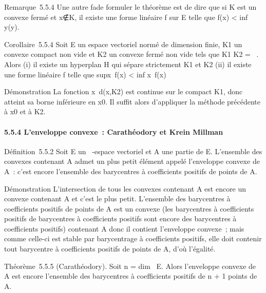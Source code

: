 Remarque~5.5.4 Une autre fa\ccon de formuler le
théorème est de dire que si K est un convexe fermé et
x∉K, il existe une forme linéaire f sur E
telle que f(x) \textless{} inf~
y\inKf(y).

Corollaire~5.5.4 Soit E un espace vectoriel normé de dimension finie,
K1 un convexe compact non vide et K2 un convexe
fermé non vide tels que K1 \bigcap K2 = \varnothing~. Alors (i) il
existe un hyperplan H qui sépare strictement K1 et
K2 (ii) il existe une forme linéaire f telle que
supx~f(x)
\textless{} inf x~f(x)

Démonstration La fonction x\mapsto~d(x,K2)
est continue sur le compact K1, donc atteint sa borne
inférieure en x0. Il suffit alors d'appliquer la méthode
précédente à x0 et à K2.

\paragraph{5.5.4 L'enveloppe convexe~: Carathéodory et Krein Millman}

Définition~5.5.2 Soit E un ~-espace vectoriel et A une partie de E.
L'ensemble des convexes contenant A admet un plus petit élément appelé
l'enveloppe convexe de A~: c'est encore l'ensemble des barycentres à
coefficients positifs de points de A.

Démonstration L'intersection de tous les convexes contenant A est encore
un convexe contenant A et c'est le plus petit. L'ensemble des
barycentres à coefficients positifs de points de A est un convexe (les
barycentres à coefficients positifs de barycentres à coefficients
positifs sont encore des barycentres à coefficients positifs) contenant
A donc il contient l'enveloppe convexe~; mais comme celle-ci est stable
par barycentrage à coefficients positifs, elle doit contenir tout
barycentre à coefficients positifs de points de A, d'où l'égalité.

Théorème~5.5.5 (Carathéodory). Soit n = dim~ E.
Alors l'enveloppe convexe de A est encore l'ensemble des barycentres à
coefficients positifs de n + 1 points de A.


